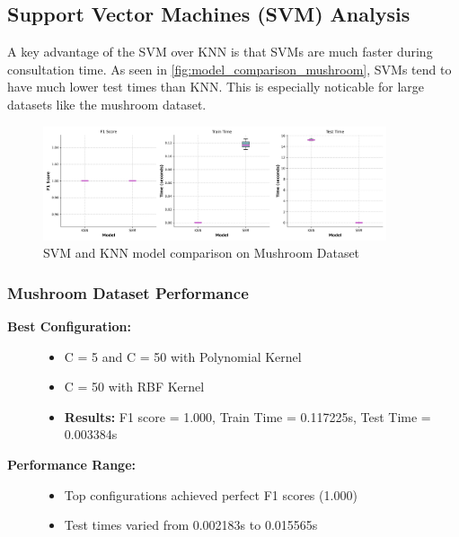 \subsection{Support Vector Machines (SVM) Analysis}
\label{subsubsec:discussion-svm}

A key advantage of the SVM over KNN is that SVMs are much faster during consultation time. As seen in \autoref{fig:model_comparison_mushroom},
SVMs tend to have much lower test times than KNN. This is especially noticable for large datasets like the mushroom dataset.

\begin{figure}
    \centering
    \includegraphics[width=0.9\textwidth]{figures/model_comparison_mushroom.png}
    \caption{SVM and KNN model comparison on Mushroom Dataset}
    \label{fig:model_comparison_mushroom}
\end{figure}

\subsubsection{Mushroom Dataset Performance}

\begin{description}
    \item[\textbf{Best Configuration:}]\leavevmode
        \begin{itemize}
            \item C = 5 and C = 50 with Polynomial Kernel
            \item C = 50 with RBF Kernel
            \item \textbf{Results:} F1 score = 1.000, Train Time = 0.117225s, Test Time = 0.003384s
        \end{itemize}
    
    \item[\textbf{Performance Range:}]\leavevmode
        \begin{itemize}
            \item Top configurations achieved perfect F1 scores (1.000)
            \item Test times varied from 0.002183s to 0.015565s
        \end{itemize}
\end{description}

